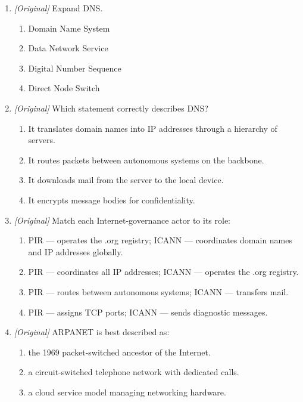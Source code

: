 \documentclass[11pt]{article}
\begin{document}
\begin{enumerate}[label=\textbf{Q\arabic*.}, leftmargin=*]
\begin{enumerate}[label=\Alph*.]
    \item transfers only control messages with no ports.
    \item routes between autonomous systems on the backbone.
  \end{enumerate}
\item \textit{[Original]} Expand DNS.
  \begin{enumerate}[label=\Alph*.]
    \item Domain Name System
    \item Data Network Service
    \item Digital Number Sequence
    \item Direct Node Switch
  \end{enumerate}
\item \textit{[Original]} Which statement correctly describes DNS?
  \begin{enumerate}[label=\Alph*.]
    \item It translates domain names into IP addresses through a hierarchy of
      servers.
    \item It routes packets between autonomous systems on the backbone.
    \item It downloads mail from the server to the local device.
    \item It encrypts message bodies for confidentiality.
  \end{enumerate}
\item \textit{[Original]} Match each Internet-governance actor to its role:
  \begin{enumerate}[label=\Alph*.]
    \item PIR --- operates the .org registry; ICANN --- coordinates domain
      names and IP addresses globally.
    \item PIR --- coordinates all IP addresses; ICANN --- operates the .org
      registry.
    \item PIR --- routes between autonomous systems; ICANN --- transfers mail.
    \item PIR --- assigns TCP ports; ICANN --- sends diagnostic messages.
  \end{enumerate}
\item \textit{[Original]} ARPANET is best described as:
  \begin{enumerate}[label=\Alph*.]
    \item the 1969 packet-switched ancestor of the Internet.
    \item a circuit-switched telephone network with dedicated calls.
    \item a cloud service model managing networking hardware.

\end{enumerate}
\end{enumerate}
\end{document}
